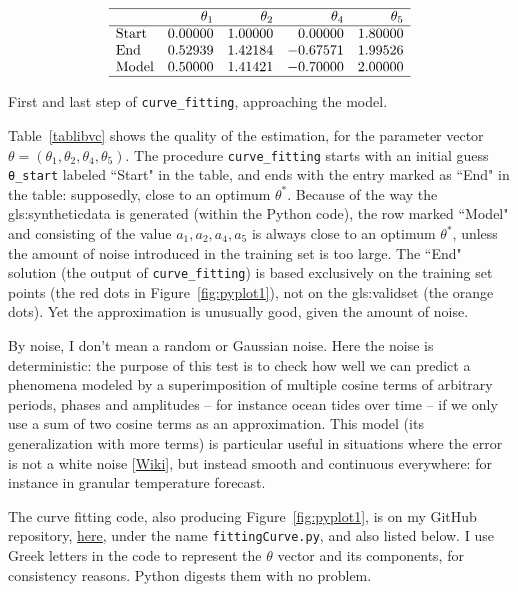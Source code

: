 \documentclass[oneside,10pt]{book}
\renewcommand{\arraystretch}{1.4} %
\begin{document}
\renewcommand{\arraystretch}{1.2} %
\begin{table}[H]
\[
\begin{array}{lrrrr}
\hline
   & \theta_1 & \theta_2  & \theta_4 & \theta_5  \\
\hline
\text{Start}	&	0.00000	&	1.00000	& 0.00000	 &  1.80000\\
\text{End}	&	0.52939	&	1.42184	&-0.67571	 &  1.99526\\
\text{Model}	&	0.50000	&	1.41421	& -0.70000	 & 2.00000  \\
\hline
\end{array}
\]
\caption{\label{tablibvc} First and last step of \texttt{curve\_fitting}, approaching the model.}
\end{table}
\renewcommand{\arraystretch}{1.0} %

Table~\ref{tablibvc} shows the quality of the estimation, for the parameter vector $\theta=(\theta_1,\theta_2,\theta_4,\theta_5)$.
The procedure \texttt{curve\_fitting} starts with an initial guess \texttt{\textcolor{gray2}{θ}\_start} labeled ``Start" in the table, and
 ends  with the entry marked as ``End" in the table: supposedly, close to an optimum $\theta^*$. Because of the way the 
\gls{gls:syntheticdata} is generated (within the Python code), the row marked ``Model" and consisting of the value 
 $a_1,a_2,a_4,a_5$ is always close to an optimum $\theta^*$,
 unless the amount of noise introduced in the training set is too large. The ``End" solution (the output of
 \texttt{curve\_fitting}) is based exclusively on the training set points (the red dots 
 in Figure~\ref{fig:pyplot1}), not on the \gls{gls:validset} (the orange dots). Yet the approximation is unusually good, given the amount of noise.

 By noise, I don't mean a random or Gaussian noise. Here the noise is deterministic: the purpose of this test is to check how well we can predict a phenomena modeled by a superimposition of multiple cosine terms of arbitrary periods, phases and amplitudes -- for instance ocean tides over time -- if we only use a sum of two cosine terms as an approximation. This model (its generalization with more terms)  is particular useful in situations where the error is not a \textcolor{index}{white noise} [\href{https://en.wikipedia.org/wiki/White_noise}{Wiki}], but instead smooth and continuous everywhere: for instance in granular temperature forecast.  

The curve fitting code, also producing Figure~\ref{fig:pyplot1}, is on my GitHub repository,
 \href{https://github.com/VincentGranville/Machine-Learning/blob/main/Source\%20Code/fittingCurve.py}{here},
 under the name \texttt{fittingCurve.py}, and also listed below. I use Greek letters in the code  to represent the $\theta$ vector and its
 components, for consistency reasons. Python digests them with no problem.  \\
 
\end{document}
